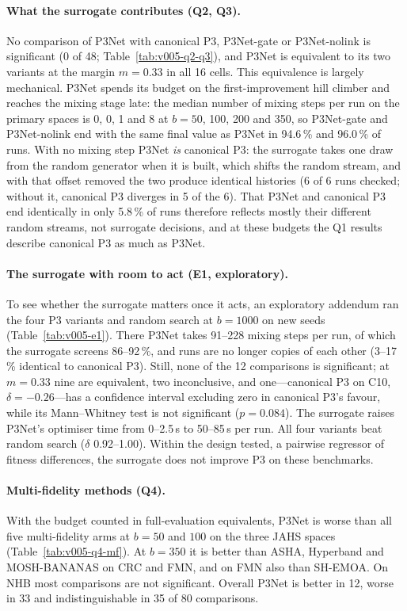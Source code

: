 \paragraph{What the surrogate contributes (Q2, Q3).} No comparison of P3Net with canonical P3, P3Net-gate or
P3Net-nolink is significant (0 of 48; Table~\ref{tab:v005-q2-q3}), and P3Net is equivalent to its two variants at
the margin $m = 0.33$ in all 16 cells. This equivalence is largely mechanical. P3Net spends its budget on the
first-improvement hill climber and reaches the mixing stage late: the median number of mixing steps per run on the
primary spaces is 0, 0, 1 and 8 at $b = 50$, 100, 200 and 350, so P3Net-gate and P3Net-nolink end with the same final
value as P3Net in 94.6\,\% and 96.0\,\% of runs. With no mixing step P3Net \emph{is} canonical P3: the surrogate
takes one draw from the random generator when it is built, which shifts the random stream, and with that offset
removed the two produce identical histories (6 of 6 runs checked; without it, canonical P3 diverges in 5 of
the 6). That P3Net and canonical P3 end identically in only
5.8\,\% of runs therefore reflects mostly their different random streams, not surrogate decisions, and at these
budgets the Q1 results describe canonical P3 as much as P3Net.

\paragraph{The surrogate with room to act (E1, exploratory).} To see whether the surrogate matters once it acts, an
exploratory addendum ran the four P3 variants and random search at $b = 1000$ on new seeds
(Table~\ref{tab:v005-e1}). There P3Net takes 91--228 mixing steps per run, of which the surrogate screens 86--92\,\%,
and runs are no longer copies of each other (3--17\,\% identical to canonical P3). Still, none of the 12
comparisons is significant; at $m = 0.33$ nine are equivalent, two inconclusive, and one---canonical P3 on C10,
$\delta = -0.26$---has a confidence interval excluding zero in canonical P3's favour, while its Mann--Whitney test is
not significant ($p = 0.084$). The surrogate raises P3Net's optimiser time from 0--2.5\,s to 50--85\,s per run. All
four variants beat random search ($\delta$ 0.92--1.00). Within the design tested, a pairwise regressor of fitness
differences, the surrogate does not improve P3 on these benchmarks.

\paragraph{Multi-fidelity methods (Q4).} With the budget counted in full-evaluation equivalents, P3Net is worse than
all five multi-fidelity arms at $b = 50$ and $100$ on the three JAHS spaces (Table~\ref{tab:v005-q4-mf}). At
$b = 350$ it is better than ASHA, Hyperband and MOSH-BANANAS on CRC and FMN, and on FMN also than SH-EMOA. On NHB most
comparisons are not significant. Overall P3Net is better in 12, worse in 33 and indistinguishable in 35 of 80
comparisons.

